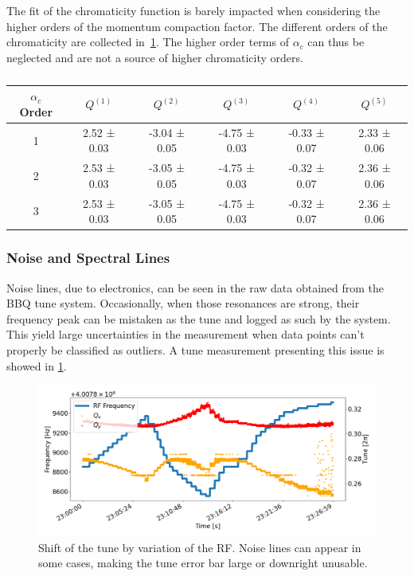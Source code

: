 The fit of the chromaticity function is barely impacted when considering the higher orders of the 
momentum compaction factor. The different orders of the chromaticity are collected
in~\cref{table:decapoles:chromaticity:alpha_c_chroma}.
The higher order terms of $\alpha_c$ can thus be neglected and are not a source of higher
chromaticity orders.

\begin{table}[tbh]
    \begin{tabular}{c|ccccc}
        $\alpha_c$ Order & $Q^{(1)}$ & $Q^{(2)}$ & $Q^{(3)}$ & $Q^{(4)}$ & $Q^{(5)}$\\
        \hline
        1 & 2.52 ± 0.03 & -3.04 ± 0.05 & -4.75 ± 0.03 & -0.33 ± 0.07 & 2.33 ± 0.06 \\
        2 & 2.53 ± 0.03 & -3.05 ± 0.05 & -4.75 ± 0.03 & -0.32 ± 0.07 & 2.36 ± 0.06 \\
        3 & 2.53 ± 0.03 & -3.05 ± 0.05 & -4.75 ± 0.03 & -0.32 ± 0.07 & 2.36 ± 0.06 \\
        \end{tabular}
    \caption{}
    \label{table:decapoles:chromaticity:alpha_c_chroma}
\end{table}



\subsubsection{Noise and Spectral Lines}

Noise lines, due to electronics, can be seen in the raw data obtained from the BBQ tune system.
Occasionally, when those resonances are strong, their frequency peak can be mistaken as the tune and
logged as such by the system. This yield large uncertainties in the measurement when data points 
can't properly be classified as outliers. A tune measurement presenting this issue is showed in 
\cref{fig:decapoles:chromaticity:noisy_tune}.

\begin{figure}[H]
    \includegraphics[width=\textwidth]{./images/noisy_tune.png}
    \caption{Shift of the tune by variation of the RF. Noise lines can appear in some cases,
    making the tune error bar large or downright unusable.}
    \label{fig:decapoles:chromaticity:noisy_tune}
\end{figure}

